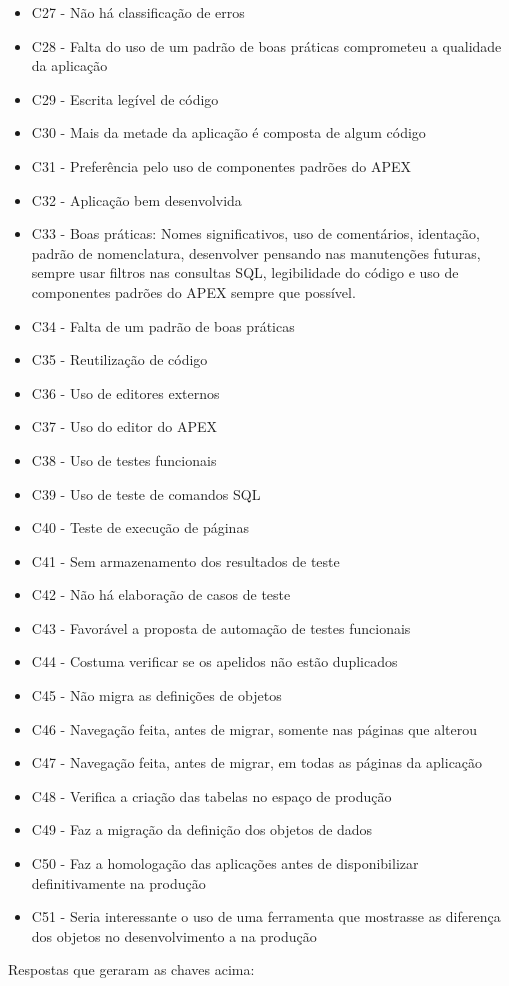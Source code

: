 \begin{itemize}
\item C27 - Não há classificação de erros
\item C28 - Falta do uso de um padrão de boas práticas comprometeu a qualidade da aplicação
\item C29 - Escrita legível de código
\item C30 - Mais da metade da aplicação é composta de algum código
\item C31 - Preferência pelo uso de componentes padrões do APEX
\item C32 - Aplicação bem desenvolvida
\item C33 - Boas práticas: Nomes significativos, uso de comentários, identação, padrão de nomenclatura, desenvolver pensando nas manutenções futuras, sempre usar filtros nas consultas SQL, legibilidade do código e uso de componentes padrões do APEX sempre que possível.
\item C34 - Falta de um padrão de boas práticas
\item C35 - Reutilização de código
\item C36 - Uso de editores externos
\item C37 - Uso do editor do APEX
\item C38 - Uso de testes funcionais
\item C39 - Uso de teste de comandos SQL
\item C40 - Teste de execução de páginas
\item C41 - Sem armazenamento dos resultados de teste
\item C42 - Não há elaboração de casos de teste
\item C43 - Favorável a proposta de automação de testes funcionais
\item C44 - Costuma verificar se os apelidos não estão duplicados
\item C45 - Não migra as definições de objetos
\item C46 - Navegação feita, antes de migrar, somente nas páginas que alterou
\item C47 - Navegação feita, antes de migrar, em todas as páginas da aplicação
\item C48 - Verifica a criação das tabelas no espaço de produção
\item C49 - Faz a migração da definição dos objetos de dados
\item C50 - Faz a homologação das aplicações antes de disponibilizar definitivamente na produção
\item C51 - Seria interessante o uso de uma ferramenta que mostrasse as diferença dos objetos no desenvolvimento a na produção\newline\newline
\end{itemize} Respostas que geraram as chaves acima:\newline


